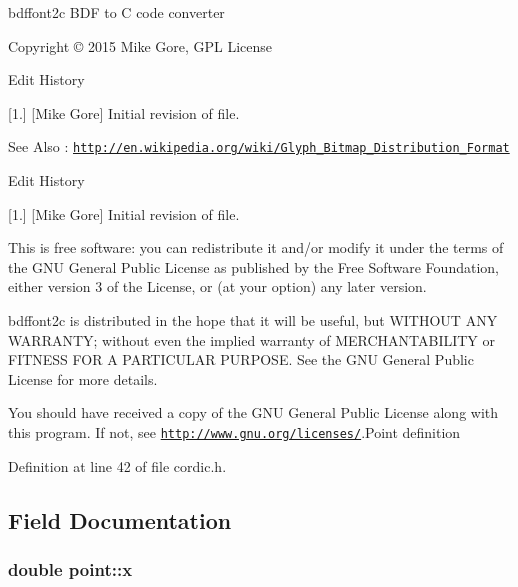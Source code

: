 \begin{DoxyParagraph}{bdffont2c B\-D\-F to C code converter}

\end{DoxyParagraph}
\begin{DoxyParagraph}{Copyright \copyright{} 2015 Mike Gore, G\-P\-L License}

\end{DoxyParagraph}
\begin{DoxyParagraph}{Edit History}

\begin{DoxyItemize}
\item \mbox{[}1.\mbox{]} \mbox{[}Mike Gore\mbox{]} Initial revision of file.
\end{DoxyItemize}
\end{DoxyParagraph}
\begin{DoxySeeAlso}{See Also}
\-: \href{http://en.wikipedia.org/wiki/Glyph_Bitmap_Distribution_Format}{\tt http\-://en.\-wikipedia.\-org/wiki/\-Glyph\-\_\-\-Bitmap\-\_\-\-Distribution\-\_\-\-Format} 
\end{DoxySeeAlso}
\begin{DoxyParagraph}{Edit History}

\begin{DoxyItemize}
\item \mbox{[}1.\mbox{]} \mbox{[}Mike Gore\mbox{]} Initial revision of file.
\end{DoxyItemize}
\end{DoxyParagraph}
This is free software\-: you can redistribute it and/or modify it under the terms of the G\-N\-U General Public License as published by the Free Software Foundation, either version 3 of the License, or (at your option) any later version.

bdffont2c is distributed in the hope that it will be useful, but W\-I\-T\-H\-O\-U\-T A\-N\-Y W\-A\-R\-R\-A\-N\-T\-Y; without even the implied warranty of M\-E\-R\-C\-H\-A\-N\-T\-A\-B\-I\-L\-I\-T\-Y or F\-I\-T\-N\-E\-S\-S F\-O\-R A P\-A\-R\-T\-I\-C\-U\-L\-A\-R P\-U\-R\-P\-O\-S\-E. See the G\-N\-U General Public License for more details.

You should have received a copy of the G\-N\-U General Public License along with this program. If not, see \href{http://www.gnu.org/licenses/}{\tt http\-://www.\-gnu.\-org/licenses/}.Point definition 

Definition at line 42 of file cordic.\-h.



\subsection{Field Documentation}
\hypertarget{structpoint_a9c6b34deaf4900ad4193c17935fd384a}{
\subsubsection[{x}]{\setlength{\rightskip}{0pt plus 5cm}double point\-::x}}\label{structpoint_a9c6b34deaf4900ad4193c17935fd384a}


